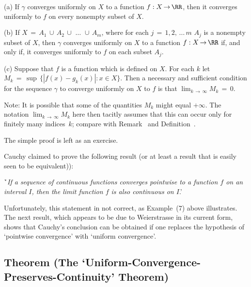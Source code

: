 \V

        (a) If ${\gamma}$ converges uniformly on $X$ to a function $f:X \,{\rightarrow}\, {\RR}$, then it converges uniformly to $f$ on every nonempty subset of $X$.

\V

        (b) If
    $X \,=\, A_{1}\,{\cup}\,A_{2}\,{\cup}\,\,{\ldots}\,\,{\cup}\,A_{m}$,
where for each $j \,=\, 1,2,\,{\ldots}\,m$ $A_{j}$ is a nonempty subset of $X$,
    then ${\gamma}$ converges uniformly on $X$ to a function $f:X \,{\rightarrow}\, {\RR}$ if, and only if, it converges uniformly to $f$ on each subset $A_{j}$.

\V

        (c) Suppose that $f$ is a function which is defined on $X$. For each $k$ let $M_{k} \,=\, {\sup}\,\{|f(x) - g_{k}(x)|: x{\in}X\}$.
    Then a necessary and sufficient condition for the sequence ${\gamma}$ to converge uniformly on $X$ to $f$ is that $\lim_{k \,{\rightarrow}\, {\infty}} M_{k} \,=\, 0$.

        Note: It is possible that some of the quantities $M_{k}$ might equal $+{\infty}$.
    The notation $\lim_{k \,{\rightarrow}\, {\infty}} M_{k}$ here then tacitly assumes that this can occur only for finitely many indices~$k$;
    compare with Remark~ and Definition~.

\V

        The simple proof is left as an exercise.

\V
\V


        Cauchy claimed to prove the following result (or at least a result that is easily seen to be equivalent)):
    
        \h `{\em If a sequence of continuous functions converges pointwise to a function $f$ on an interval $I$, then the limit function $f$ is also continuous on $I$}.'

\noindent Unfortunately, this statement in not correct, as Example~(7) above illustrates.
    The next result, which appears to be due to Weierstrasse in its current form,
    shows that Cauchy's conclusion can be obtained if one replaces the hypothesis of `pointwise convergence' with `uniform convergence'.
 

\V

            \subsection{\small{\bf Theorem} (The `Uniform-Convergence-Preserves-Continuity' Theorem)}
            \label{ThmF05.40}

